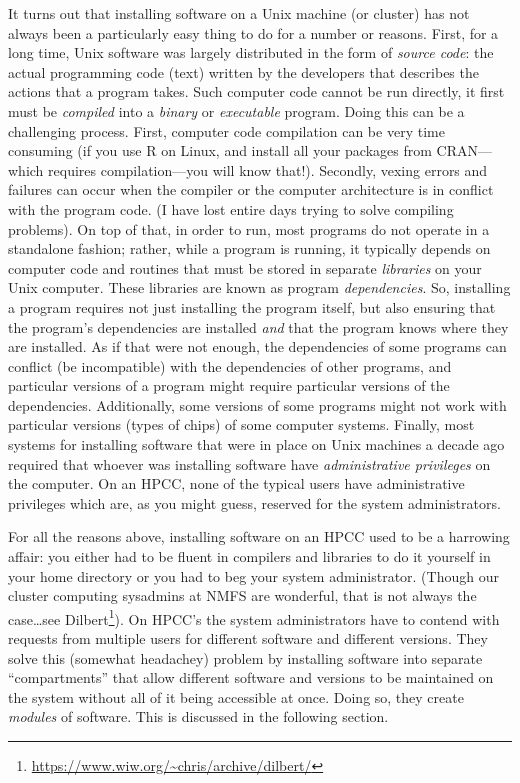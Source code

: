 \documentclass[]{krantz}
\renewcommand{\href}[2]{#2\footnote{\url{#1}}}
\begin{document}
It turns out that installing software on a Unix machine (or cluster) has not
always been a particularly easy thing to do for a number or reasons. First, for
a long time, Unix software was largely distributed in the form of \emph{source code}: the
actual programming code (text) written by the developers that describes the actions
that a program takes. Such computer code cannot be run directly, it first must be
\emph{compiled} into a \emph{binary} or \emph{executable} program. Doing this can be a challenging
process. First, computer code compilation can be very time consuming (if you use R
on Linux, and install all your packages from CRAN---which requires compilation---you
will know that!). Secondly, vexing errors and failures can occur when the
compiler or the computer architecture is in conflict with the program code. (I have lost
entire days trying to solve compiling problems). On top of that, in order to run, most
programs do not operate in a standalone fashion; rather, while a program is running, it
typically depends on computer code and routines that must be stored in separate \emph{libraries} on your
Unix computer. These libraries are known as program \emph{dependencies}. So, installing a program
requires not just installing the program itself, but also ensuring that the program's dependencies
are installed \emph{and} that the program knows where they are installed. As if that were not enough,
the dependencies of some programs can conflict (be incompatible) with the dependencies of other
programs, and particular versions of a program might require particular versions of
the dependencies. Additionally, some versions of some programs might not work with particular
versions (types of chips) of some computer systems. Finally, most systems for installing
software that were in place on Unix
machines a decade ago required that whoever was installing software have \emph{administrative privileges}
on the computer. On an HPCC, none of the typical users have administrative privileges which are,
as you might guess, reserved for the system administrators.

For all the reasons above, installing software on an HPCC used to be a harrowing
affair: you either had to be fluent in compilers and libraries to do it yourself in your
home directory or you had to beg your system administrator. (Though our cluster computing
sysadmins at NMFS are wonderful, that is not always the case\ldots{}\href{https://www.wiw.org/~chris/archive/dilbert/}{see Dilbert}).
On HPCC's the system administrators have to contend with requests from multiple users
for different software and different versions. They solve this (somewhat headachey)
problem by installing software into separate ``compartments'' that allow different software
and versions to be maintained on the system without all of it being accessible at once.
Doing so, they create \emph{modules} of software. This is discussed in the following section.
\end{document}
